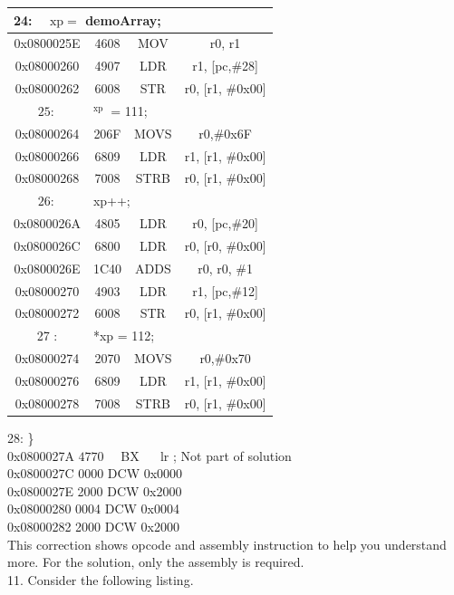 \documentclass[10pt]{article}
\begin{document}
\begin{center}
\begin{tabular}{|c|c|c|c|}
\hline
\multicolumn{4}{|l|}{24: $\quad \mathrm{xp}=$ demoArray;} \\
\hline
0x0800025E & 4608 & MOV & r0, r1 \\
\hline
0x08000260 & 4907 & LDR & r1, [pc,\#28] \\
\hline
0x08000262 & 6008 & STR & r0, [r1, \#0x00] \\
\hline
$25:$ & \multicolumn{3}{|l|}{${ }^{\text {xp }}$ = 111;} \\
\hline
0x08000264 & 206F & MOVS & r0,\#0x6F \\
\hline
0x08000266 & 6809 & LDR & r1, [r1, \#0x00] \\
\hline
0x08000268 & 7008 & STRB & r0, [r1, \#0x00] \\
\hline
$26:$ & \multicolumn{3}{|l|}{xp++;} \\
\hline
0x0800026A & 4805 & LDR & r0, [pc,\#20] \\
\hline
0x0800026C & 6800 & LDR & r0, [r0, \#0x00] \\
\hline
0x0800026E & 1C40 & ADDS & r0, r0, \#1 \\
\hline
0x08000270 & 4903 & LDR & r1, [pc,\#12] \\
\hline
0x08000272 & 6008 & STR & r0, [r1, \#0x00] \\
\hline
27 : & \multicolumn{3}{|l|}{*xp = 112;} \\
\hline
0x08000274 & 2070 & MOVS & r0,\#0x70 \\
\hline
0x08000276 & 6809 & LDR & r1, [r1, \#0x00] \\
\hline
0x08000278 & 7008 & STRB & r0, [r1, \#0x00] \\
\hline
\end{tabular}
\end{center}

28: \}\\
0x0800027A $4770 \quad$ BX $\quad$ lr ; Not part of solution\\
0x0800027C 0000 DCW 0x0000\\
0x0800027E 2000 DCW 0x2000\\
0x08000280 0004 DCW 0x0004\\
0x08000282 2000 DCW 0x2000\\
This correction shows opcode and assembly instruction to help you understand more. For the solution, only the assembly is required.\\
11. Consider the following listing.
\end{document}
